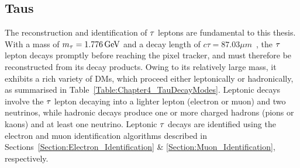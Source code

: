 \subsection{Taus}
\label{Section:Chapter4_Taus}

The reconstruction and identification of $\tau$ leptons are fundamental to this thesis. With a mass of $m_\tau = 1.776\,\text{Ge\hspace{-.08em}V}$ and a decay length of $c\tau = 87.03\unit{\mu m}$~\cite{ParticleMasses}, the $\tau$ lepton decays promptly before reaching the pixel tracker, and must therefore be reconstructed from its decay products. Owing to its relatively large mass, it exhibits a rich variety of \acp{DM}, which proceed either leptonically or hadronically, as summarised in Table~\ref{Table:Chapter4_TauDecayModes}. Leptonic decays involve the $\tau$ lepton decaying into a lighter lepton (electron or muon) and two neutrinos, while hadronic decays produce one or more charged hadrons (pions or kaons) and at least one neutrino. Leptonic $\tau$ decays are identified using the electron and muon identification algorithms described in Sections~\ref{Section:Electron_Identification} \& \ref{Section:Muon_Identification}, respectively.

